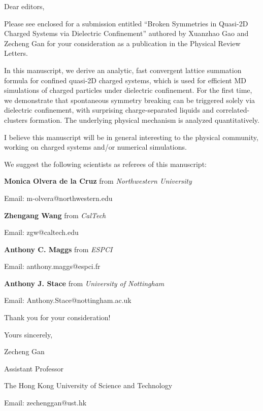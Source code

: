 \documentclass[blue,formal,12pt]{ustcletter}
\begin{document}
Dear editors,

\vspace{0.3cm}

Please see enclosed for a submission entitled ``Broken Symmetries in Quasi-2D Charged Systems via Dielectric Confinement'' authored by Xuanzhao Gao and Zecheng Gan for your consideration as a publication in the Physical Review Letters.

\vspace{0.3cm}

In this manuscript, we derive an analytic, fast convergent lattice summation formula for confined quasi-2D charged systems, which is used for efficient MD simulations of charged particles under dielectric confinement. 
For the first time, we demonstrate that spontaneous symmetry breaking can be triggered solely via dielectric confinement, with surprising charge-separated liquids and correlated-clusters formation. 
The underlying physical mechanism is analyzed quantitatively.

\vspace{0.3cm}

I believe this manuscript will be in general interesting to the physical community, working on charged systems and/or numerical simulations.

\vspace{0.3cm}

We suggest the following scientists as referees of this manuscript:

\textbf{Monica Olvera de la Cruz} from \emph{Northwestern University}

Email: m-olvera@northwestern.edu

\vspace{0.3cm}

\textbf{Zhengang Wang} from \emph{CalTech}

Email: zgw@caltech.edu

\vspace{0.3cm}

\textbf{Anthony C. Maggs} from \emph{ESPCI}

Email: anthony.maggs@espci.fr

\vspace{0.3cm}

\textbf{Anthony J. Stace} from \emph{University of Nottingham}

Email: Anthony.Stace@nottingham.ac.uk

\vspace{0.3cm}

Thank you for your consideration! 

\begin{flushright}
Yours sincerely,

Zecheng Gan


Assistant Professor

The Hong Kong University of Science and Technology

Email: zechenggan@ust.hk
\end{flushright}
\end{document}
